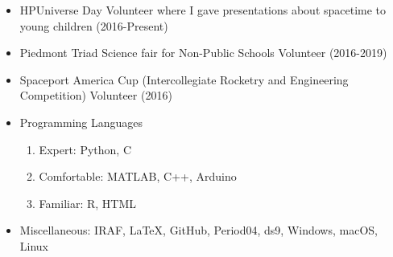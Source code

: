 \documentclass[letterpaper,12pt]{article}
\begin{document}
\vspace{3mm}
\noindent{}

\vspace{-2mm}
\begin{itemize}
    \item HPUniverse Day Volunteer where I gave presentations about spacetime to young children (2016-Present)\vspace{-3mm}
    \item Piedmont Triad Science fair for Non-Public Schools Volunteer (2016-2019)\vspace{-3mm}
    \item Spaceport America Cup (Intercollegiate Rocketry and Engineering Competition) Volunteer (2016)\vspace{-1mm}
    
\end{itemize}

\vspace{3mm}
\noindent{}

\vspace{-2mm}
\begin{itemize}
    \item Programming Languages
    \begin{enumerate}\vspace{-3mm}
        \item Expert: Python, C \vspace{-1mm}
        \item Comfortable: MATLAB, C++, Arduino\vspace{-1mm}
        \item Familiar: R, HTML
    \end{enumerate}\vspace{-4mm}
    \item Miscellaneous: IRAF, \LaTeX, GitHub, Period04, ds9, Windows, macOS, Linux\vspace{-2mm}
    
\end{itemize}
\end{document}
